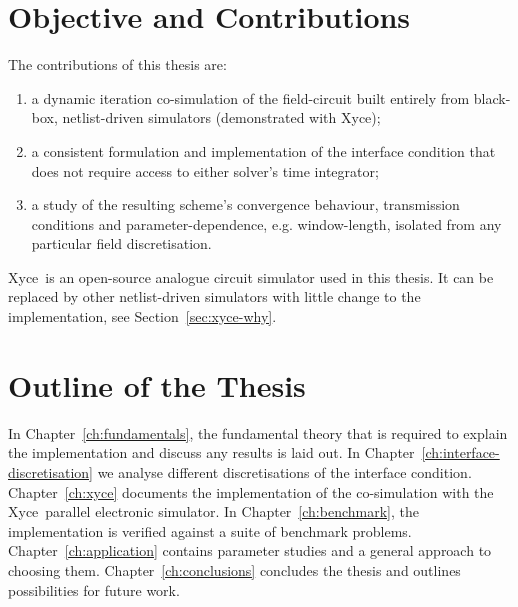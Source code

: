 \section{Objective and Contributions} \label{sec:objective-contributions}
The contributions of this thesis are:
\begin{enumerate}
	\item a dynamic iteration co-simulation of the field-circuit built entirely from black-box, netlist-driven simulators (demonstrated with Xyce\texttrademark);
	\item a consistent formulation and implementation of the interface condition that does not require access to either solver's time integrator;
	\item a study of the resulting scheme's convergence behaviour, transmission conditions and parameter-dependence, e.g. window-length, isolated from any particular field discretisation.
\end{enumerate}
Xyce\texttrademark \ is an open-source analogue circuit simulator used in this thesis. It can be replaced by other netlist-driven simulators with little change to the implementation, see Section~\ref{sec:xyce-why}.

\section{Outline of the Thesis}
In Chapter~\ref{ch:fundamentals}, the fundamental theory that is required to explain the implementation and discuss any results is laid out. In Chapter~\ref{ch:interface-discretisation} we analyse different discretisations of the interface condition. Chapter~\ref{ch:xyce} documents the implementation of the co-simulation with the Xyce\texttrademark \ parallel electronic simulator. In Chapter~\ref{ch:benchmark}, the implementation is verified against a suite of benchmark problems. Chapter~\ref{ch:application} contains parameter studies and a general approach to choosing them. Chapter~\ref{ch:conclusions} concludes the thesis and outlines possibilities for future work.